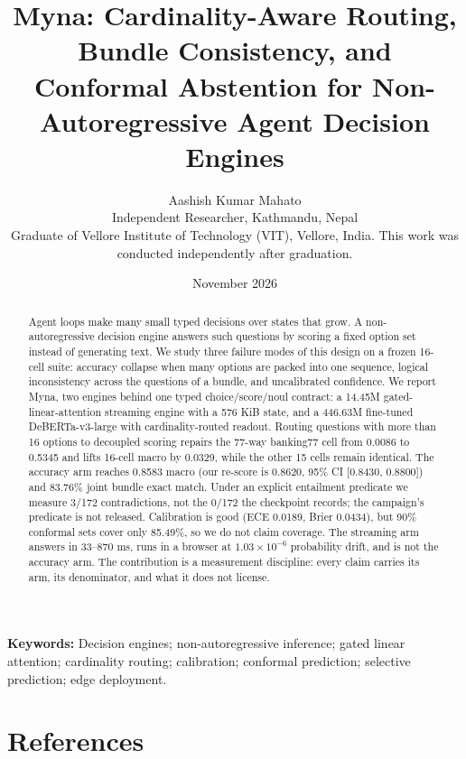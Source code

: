 \documentclass[11pt]{article}
\title{Myna: Cardinality-Aware Routing, Bundle Consistency, and Conformal Abstention for Non-Autoregressive Agent Decision Engines}
\author{Aashish Kumar Mahato\\Independent Researcher, Kathmandu, Nepal\\[2pt]\small Graduate of Vellore Institute of Technology (VIT), Vellore, India. This work was conducted independently after graduation.}
\date{November 2026}
\begin{document}
\maketitle
\begin{abstract}
Agent loops make many small typed decisions over states that grow. A non-autoregressive decision engine answers such questions by scoring a fixed option set instead of generating text. We study three failure modes of this design on a frozen 16-cell suite: accuracy collapse when many options are packed into one sequence, logical inconsistency across the questions of a bundle, and uncalibrated confidence. We report Myna, two engines behind one typed choice/score/noul contract: a 14.45M gated-linear-attention streaming engine with a 576 KiB state, and a 446.63M fine-tuned DeBERTa-v3-large with cardinality-routed readout. Routing questions with more than 16 options to decoupled scoring repairs the 77-way banking77 cell from 0.0086 to 0.5345 and lifts 16-cell macro by 0.0329, while the other 15 cells remain identical. The accuracy arm reaches 0.8583 macro (our re-score is 0.8620, 95\% CI [0.8430, 0.8800]) and 83.76\% joint bundle exact match. Under an explicit entailment predicate we measure 3/172 contradictions, not the 0/172 the checkpoint records; the campaign's predicate is not released. Calibration is good (ECE 0.0189, Brier 0.0434), but 90\% conformal sets cover only 85.49\%, so we do not claim coverage. The streaming arm answers in 33--870 ms, runs in a browser at $1.03\times10^{-6}$ probability drift, and is not the accuracy arm. The contribution is a measurement discipline: every claim carries its arm, its denominator, and what it does not license.
\end{abstract}
\noindent\textbf{Keywords:} Decision engines; non-autoregressive inference; gated linear attention; cardinality routing; calibration; conformal prediction; selective prediction; edge deployment.



\section*{References}
\end{document}
